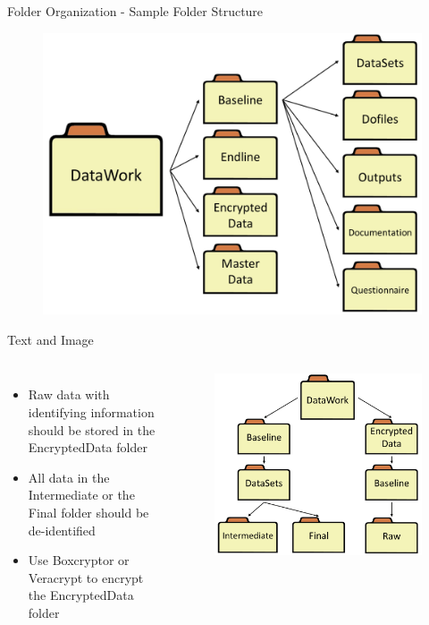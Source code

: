 \documentclass[aspectratio=169]{beamer}
\begin{document}
\begin{frame}{Folder Organization - Sample Folder Structure}
	\begin{figure}
		\centering
		\includegraphics[width=.7\linewidth]{img/folderstructure}
	\end{figure}
\end{frame}

\begin{frame}[fragile]{Text and Image}
	\begin{columns}[c]
		\begin{itemize}
			\item Raw data with identifying information should be stored in the EncryptedData folder
			\item All data in the Intermediate or the Final folder should be de-identified
			\item Use Boxcryptor or Veracrypt to encrypt the EncryptedData folder
		\end{itemize}

		\begin{figure}
			\centering
			\includegraphics[width=\linewidth]{img/folderstructure2}
		\end{figure}
	\end{columns}
\end{frame}
\end{document}
